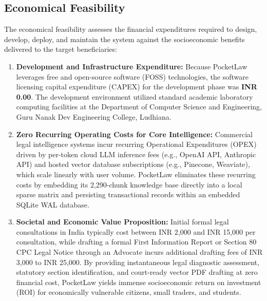 \subsection{Economical Feasibility}
The economical feasibility assesses the financial expenditures required to design, develop, deploy, and maintain the system against the socioeconomic benefits delivered to the target beneficiaries:
\begin{enumerate}
    \item \textbf{Development and Infrastructure Expenditure:}
    Because PocketLaw leverages free and open-source software (FOSS) technologies, the software licensing capital expenditure (CAPEX) for the development phase was \textbf{INR 0.00}. The development environment utilized standard academic laboratory computing facilities at the Department of Computer Science and Engineering, Guru Nanak Dev Engineering College, Ludhiana.
    
    \item \textbf{Zero Recurring Operating Costs for Core Intelligence:}
    Commercial legal intelligence systems incur recurring Operational Expenditures (OPEX) driven by per-token cloud LLM inference fees (e.g., OpenAI API, Anthropic API) and hosted vector database subscriptions (e.g., Pinecone, Weaviate), which scale linearly with user volume. PocketLaw eliminates these recurring costs by embedding its 2,290-chunk knowledge base directly into a local sparse matrix and persisting transactional records within an embedded SQLite WAL database.
    
    \item \textbf{Societal and Economic Value Proposition:}
    Initial formal legal consultations in India typically cost between INR 2,000 and INR 15,000 per consultation, while drafting a formal First Information Report or Section 80 CPC Legal Notice through an Advocate incurs additional drafting fees of INR 3,000 to INR 25,000. By providing instantaneous legal diagnostic assessment, statutory section identification, and court-ready vector PDF drafting at zero financial cost, PocketLaw yields immense socioeconomic return on investment (ROI) for economically vulnerable citizens, small traders, and students.
\end{enumerate}

